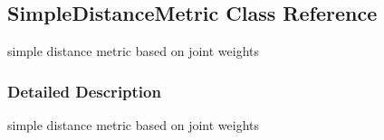 \hypertarget{classOpenRAVE_1_1planningutils_1_1SimpleDistanceMetric}{
\subsection{SimpleDistanceMetric Class Reference}
\label{classOpenRAVE_1_1planningutils_1_1SimpleDistanceMetric}
}


simple distance metric based on joint weights  




\subsubsection{Detailed Description}
simple distance metric based on joint weights 